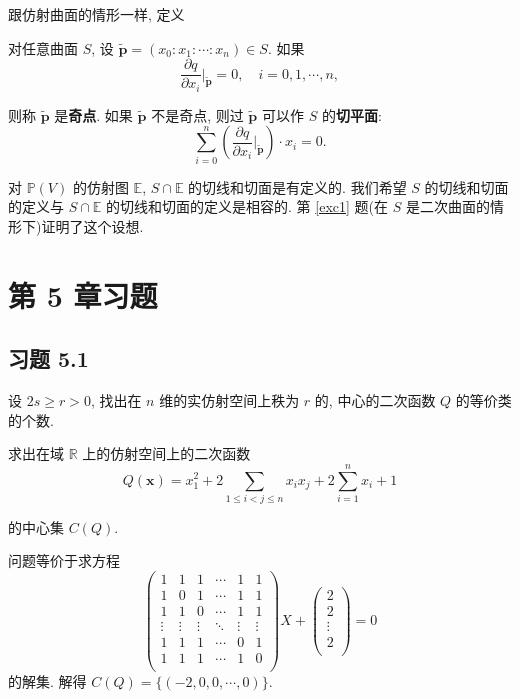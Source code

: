 \documentclass{ctexart}
\begin{document}
跟仿射曲面的情形一样, 定义
\begin{definition}
    对任意曲面 $S$, 设 $\tilde{\boldsymbol{p}}=(x_0:x_1:\cdots:x_n)\in S$. 如果
    \[\dfrac{\partial q}{\partial x_i}\Bigg|_{\tilde{\boldsymbol{p}}}=0,\quad i=0,1,\cdots,n,\]

    则称 $\tilde{\boldsymbol{p}}$ 是\textbf{奇点}. 如果 $\tilde{\boldsymbol{p}}$ 不是奇点, 则过 $\tilde{\boldsymbol{p}}$ 可以作 $S$ 的\textbf{切平面}:
    \[\sum\limits_{i=0}^n\left(\dfrac{\partial q}{\partial x_i}\bigg|_{\tilde{\boldsymbol{p}}}\right)\cdot x_i=0.\]
\end{definition}


对 $\mathbb{P}(V)$ 的仿射图 $\mathbb{E}$, $S\cap\mathbb{E}$ 的切线和切面是有定义的. 我们希望 $S$ 的切线和切面的定义与 $S\cap\mathbb{E}$ 的切线和切面的定义是相容的. 第 \ref{exc1} 题(在 $S$ 是二次曲面的情形下)证明了这个设想.
\section{第 5 章习题}
\subsection{习题 5.1}
\begin{exercise}%
    设 $2s\geq r>0$, 找出在 $n$ 维的实仿射空间上秩为 $r$ 的, 中心的二次函数 $Q$ 的等价类的个数.
\end{exercise}
\begin{solution}
\end{solution}
\begin{exercise}%
    求出在域 $\mathbb{R}$ 上的仿射空间上的二次函数
    \[Q(\boldsymbol{x})=x_1^2+2\sum\limits_{1\leq i<j\leq n}x_ix_j+2\sum\limits_{i=1}^nx_i+1\]

    的中心集 $C(Q)$.
\end{exercise}
\begin{solution}
    问题等价于求方程
    \[\begin{pmatrix}
        1 & 1 & 1 & \cdots & 1 & 1 \\
        1 & 0 & 1 & \cdots & 1 & 1 \\
        1 & 1 & 0 & \cdots & 1 & 1 \\
        \vdots & \vdots & \vdots & \ddots & \vdots & \vdots \\
        1 & 1 & 1 & \cdots & 0 & 1 \\
        1 & 1 & 1 & \cdots & 1 & 0 \\
    \end{pmatrix}X+\begin{pmatrix}
        2 \\
        2 \\
        \vdots \\
        2 \\
    \end{pmatrix}=0\]
    的解集. 解得 $C(Q)=\{(-2,0,0,\cdots,0)\}$.
\end{solution}
\end{document}
